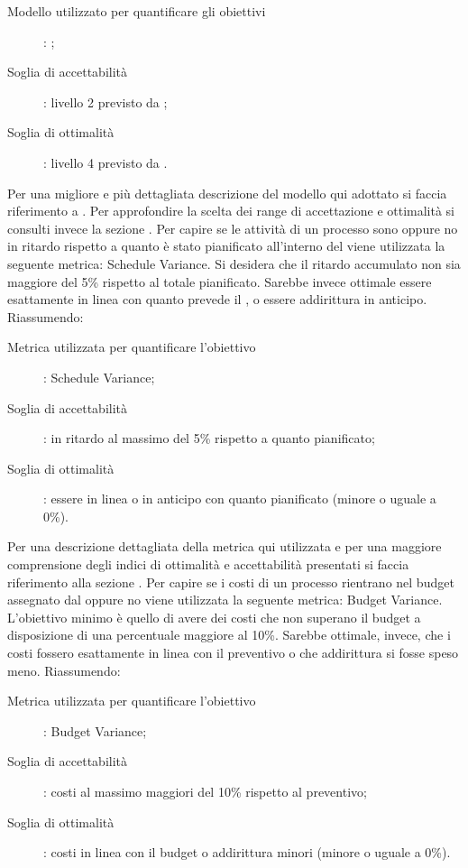 				\begin{description}
					\item[Modello utilizzato per quantificare gli obiettivi]: ;
					\item[Soglia di accettabilità]: livello 2 previsto da ;
					\item[Soglia di ottimalità]: livello 4 previsto da .
				\end{description}
				Per una migliore e più dettagliata descrizione del modello  qui adottato si faccia riferimento a . Per approfondire la scelta dei range di accettazione e ottimalità si consulti invece la sezione .
				Per capire se le attività di un processo sono oppure no in ritardo rispetto a quanto è stato pianificato all'interno del  viene utilizzata la seguente metrica: Schedule Variance. Si desidera che il ritardo accumulato non sia maggiore del 5\% rispetto al totale pianificato. Sarebbe invece ottimale essere esattamente in linea con quanto prevede il , o essere addirittura in anticipo. Riassumendo:
				\begin{description}
					\item[Metrica utilizzata per quantificare l'obiettivo]: Schedule Variance;
					\item[Soglia di accettabilità]: in ritardo al massimo del 5\% rispetto a quanto pianificato;
					\item[Soglia di ottimalità]: essere in linea o in anticipo con quanto pianificato (minore o uguale a 0\%).
				\end{description}
				Per una descrizione dettagliata della metrica qui utilizzata e per una maggiore comprensione degli indici di ottimalità e accettabilità presentati si faccia riferimento alla sezione .
				Per capire se i costi di un processo rientrano nel budget assegnato dal  oppure no viene utilizzata la seguente metrica: Budget Variance. L'obiettivo minimo è quello di avere dei costi che non superano il budget a disposizione di una percentuale maggiore al 10\%. Sarebbe ottimale, invece, che i costi fossero esattamente in linea con il preventivo o che addirittura si fosse speso meno. Riassumendo:
				\begin{description}
					\item[Metrica utilizzata per quantificare l'obiettivo]: Budget Variance;
					\item[Soglia di accettabilità]: costi al massimo maggiori del 10\% rispetto al preventivo;
					\item[Soglia di ottimalità]: costi in linea con il budget o addirittura minori (minore o uguale a 0\%).
				\end{description}
